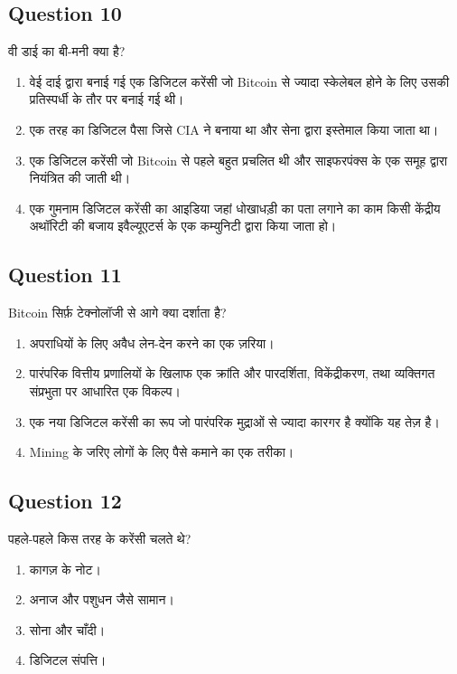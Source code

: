 \documentclass[12pt,a4paper]{article}
\begin{document}
\bigskip


\subsection*{Question 10}
वी डाई का बी-मनी क्या है?

\begin{enumerate}[label=\Alph*., leftmargin=*]
\item वेई दाई द्वारा बनाई गई एक डिजिटल करेंसी जो Bitcoin से ज्यादा स्केलेबल होने के लिए उसकी प्रतिस्पर्धी के तौर पर बनाई गई थी।
\item एक तरह का डिजिटल पैसा जिसे CIA ने बनाया था और सेना द्वारा इस्तेमाल किया जाता था।
\item एक डिजिटल करेंसी जो Bitcoin से पहले बहुत प्रचलित थी और साइफरपंक्स के एक समूह द्वारा नियंत्रित की जाती थी।
\item एक गुमनाम डिजिटल करेंसी का आइडिया जहां धोखाधड़ी का पता लगाने का काम किसी केंद्रीय अथॉरिटी की बजाय इवैल्यूएटर्स के एक कम्युनिटी द्वारा किया जाता हो।
\end{enumerate}

\bigskip


\subsection*{Question 11}
Bitcoin सिर्फ़ टेक्नोलॉजी से आगे क्या दर्शाता है?

\begin{enumerate}[label=\Alph*., leftmargin=*]
\item अपराधियों के लिए अवैध लेन-देन करने का एक ज़रिया।
\item पारंपरिक वित्तीय प्रणालियों के खिलाफ एक क्रांति और पारदर्शिता, विकेंद्रीकरण, तथा व्यक्तिगत संप्रभुता पर आधारित एक विकल्प।
\item एक नया डिजिटल करेंसी का रूप जो पारंपरिक मुद्राओं से ज्यादा कारगर है क्योंकि यह तेज़ है।
\item Mining के जरिए लोगों के लिए पैसे कमाने का एक तरीका।
\end{enumerate}

\bigskip


\subsection*{Question 12}
पहले-पहले किस तरह के करेंसी चलते थे?

\begin{enumerate}[label=\Alph*., leftmargin=*]
\item कागज़ के नोट।
\item अनाज और पशुधन जैसे सामान।
\item सोना और चाँदी।
\item डिजिटल संपत्ति।
\end{enumerate}
\end{document}
